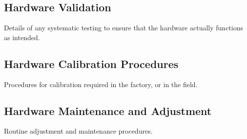 \documentclass[MTRX3700report.tex]{subfiles}
\begin{document}
\subsection{Hardware Validation}
Details of any systematic testing to ensure that the hardware actually functions as intended.
\subsection{Hardware Calibration Procedures}
Procedures for calibration required in the factory, or in the field.
\subsection{Hardware Maintenance and Adjustment}
Routine adjustment and maintenance procedures.
\end{document}
